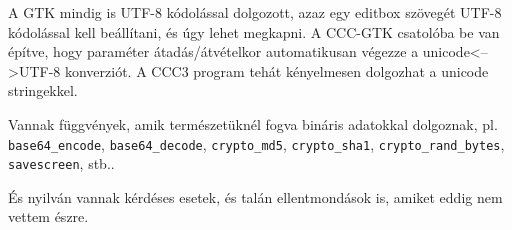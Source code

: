 A GTK mindig is UTF-8 kódolással dolgozott, azaz egy editbox
szövegét UTF-8 kódolással kell beállítani, és úgy lehet megkapni.
A CCC-GTK csatolóba be van építve, hogy paraméter átadás/átvételkor
automatikusan végezze a unicode<-->UTF-8 konverziót.
A CCC3 program tehát kényelmesen dolgozhat a unicode
stringekkel.

Vannak függvények, amik természetüknél fogva bináris
adatokkal dolgoznak, pl. 
\verb!base64_encode!,
\verb!base64_decode!, 
\verb!crypto_md5!, 
\verb!crypto_sha1!,
\verb!crypto_rand_bytes!,
\verb!savescreen!, stb..

És nyilván vannak kérdéses esetek, és talán ellentmondások is,
amiket eddig nem vettem észre.


\begin{verbatim}
\end{verbatim}
